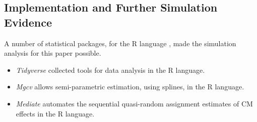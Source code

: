 
\subsection{Implementation and Further Simulation Evidence}
\label{appendix:implement}
A number of statistical packages, for the R language \citep{R2023}, made the simulation analysis for this paper possible.
\begin{itemize}
    \item \textit{Tidyverse} \citep{tidyverse} collected tools for data analysis in the R language.
    \item \textit{Mgcv} \citep{wood2016mgcv} allows semi-parametric estimation, using splines, in the R language.
    \item \textit{Mediate} \citep{tingley2014mediation} automates the sequential quasi-random assignment estimates of CM effects \citep{imai2010identification} in the R language.
\end{itemize}

